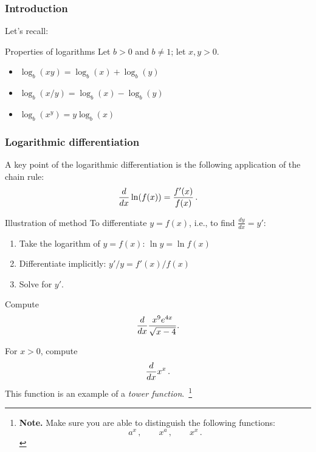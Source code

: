 \documentclass[10pt,t,presentation,ignorenonframetext,aspectratio=169]{beamer}
\title[\course]{\lecTitle}
\institute[Ohio State]
{
  \medskip
}
\date[\week]{\semester}
\author{Tae Eun Kim, Ph.D.}
\begin{document}
\begin{frame}
  \titlepage
\end{frame}

\begin{frame}
  \frametitle{Introduction}
  Let's recall:

  \begin{block}{Properties of logarithms}
    Let $b>0$ and $b \neq 1$; let $x, y > 0$.
    \begin{itemize}
    \item $\log_b(xy) = \log_b(x) + \log_b(y)$
    \item $\log_b(x/y) = \log_b(x) - \log_b(y)$
    \item $\log_b(x^y) = y\log_b(x)$
    \end{itemize}
  \end{block}
\end{frame}

\begin{frame}
  \frametitle{Logarithmic differentiation}
  A key point of the logarithmic differentiation is the following
  application of the chain rule:
  \[
    \frac{d}{\mathop{}\!d x} \ln ( f(x) ) = \frac{f'(x)}{f(x)} \,.
  \]

  \begin{block}{Illustration of method}
    To differentiate $y = f(x)$, i.e., to find $\frac{dy}{dx} = y'$:
    \begin{enumerate}
    \item Take the logarithm of $y = f(x)$: $\ln y = \ln f(x)$
    \item Differentiate implicitly: $y'/y =  f'(x)/f(x)$
    \item Solve for $y'$.
    \end{enumerate}
  \end{block}
\end{frame}

\begin{frame}
  \vs
  \begin{question}
    Compute
    \[
      \frac{d}{\mathop{}\!d x} \frac{x^9e^{4x}}{\sqrt{x-4}}.
    \]
  \end{question}
\end{frame}

\begin{frame}
  \vs
  \begin{question}
    For  $x>0$, compute
    \[
      \frac{d}{\mathop{}\!d x} x^x \,.
    \]
    This function is an example of a \textit{tower
      function}.~\footnote{
      \textbf{Note.} Make sure you are able to distinguish the following functions:
      \[
        a^x\,, \qquad x^a\,, \qquad x^x \,.
      \]
    }
  \end{question}
\end{frame}
\end{document}
